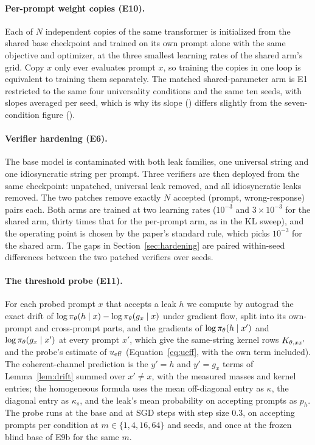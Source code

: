 \paragraph{Per-prompt weight copies (E10).} Each of $N$ independent copies of the same transformer is initialized from the shared base checkpoint and trained on its own prompt alone with the same objective and optimizer, at the three smallest learning rates of the shared arm's grid. Copy $x$ only ever evaluates prompt $x$, so training the copies in one loop is equivalent to training them separately. The matched shared-parameter arm is E1 restricted to the same four universality conditions and the same ten seeds, with slopes averaged per seed, which is why its slope (\SharedSlopeMatched{}) differs slightly from the seven-condition figure (\NuTwoNeuralSlope{}).

\paragraph{Verifier hardening (E6).} The base model is contaminated with both leak families, one universal string and one idiosyncratic string per prompt. Three verifiers are then deployed from the same checkpoint: unpatched, universal leak removed, and all idiosyncratic leaks removed. The two patches remove exactly $N$ accepted (prompt, wrong-response) pairs each. Both arms are trained at two learning rates ($10^{-3}$ and $3\times10^{-3}$ for the shared arm, thirty times that for the per-prompt arm, as in the KL sweep), and the operating point is chosen by the paper's standard rule, which picks $10^{-3}$ for the shared arm. The gaps in Section~\ref{sec:hardening} are paired within-seed differences between the two patched verifiers over \NuFiveCNSeeds{} seeds.

\paragraph{The threshold probe (E11).} For each probed prompt $x$ that accepts a leak $h$ we compute by autograd the exact drift of $\log\pi_\theta(h\mid x)-\log\pi_\theta(g_x\mid x)$ under gradient flow, split into its own-prompt and cross-prompt parts, and the gradients of $\log\pi_\theta(h\mid x')$ and $\log\pi_\theta(g_x\mid x')$ at every prompt $x'$, which give the same-string kernel rows $K_{\theta,xx'}$ and the probe's estimate of $u_{\mathrm{eff}}$ (Equation~\eqref{eq:ueff}, with the own term included). The coherent-channel prediction is the $y'=h$ and $y'=g_x$ terms of Lemma~\ref{lem:drift} summed over $x'\neq x$, with the measured masses and kernel entries; the homogeneous formula uses the mean off-diagonal entry as $\kappa$, the diagonal entry as $\kappa_s$, and the leak's mean probability on accepting prompts as $p_h$. The probe runs at the base and at SGD steps \ProbeSteps{} with step size $0.3$, on \ProbeCap{} accepting prompts per condition at $m\in\{1,4,16,64\}$ and \ProbeNSeeds{} seeds, and once at the frozen blind base of E9b for the same $m$.

